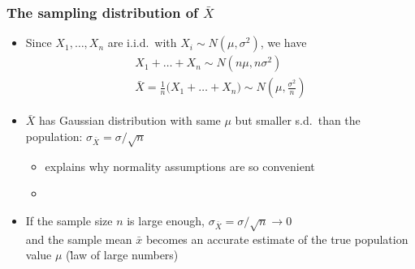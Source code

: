 \documentclass[t]{beamer} %
\begin{document}
\begin{frame}
  \frametitle{The sampling distribution of $\bar{X}$}

  \begin{itemize}
  \item Since $X_1, \ldots, X_n$ are i.i.d.\ with $X_i\sim N(\mu, \sigma^2)$,
    we have
    \begin{gather*}
      X_1 + \dots + X_n \sim N(n \mu, n \sigma^2) \\
      \bar{X} = \frac{1}{n} \bigl( X_1 + \dots + X_n \bigr) 
      \sim N(\mu, \frac{\sigma^2}{n})
    \end{gather*}
  \item $\bar{X}$ has Gaussian distribution with same $\mu$ but smaller s.d.\
    than the population: $\sigma_{\bar{X}} = \sigma / \sqrt{n}$
    \begin{itemize}
    \item[\hand] explains why normality assumptions are so convenient
    \item[]
    \end{itemize}
    \pause
  \item If the sample size $n$ is large enough, $\sigma_{\bar{X}} = \sigma /
    \sqrt{n} \to 0$\\ and the sample mean $\bar{x}$ becomes an accurate estimate
    of the true population value $\mu$ (\h{law of large numbers})
  \end{itemize}
\end{frame}
\end{document}

